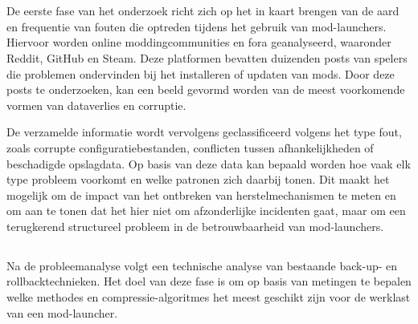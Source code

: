 
\chapter{}%
\label{ch:methodologie}

\section{}%
\label{sec:fase1-probleemanalyse}

De eerste fase van het onderzoek richt zich op het in kaart brengen van de aard en frequentie van fouten die optreden tijdens het gebruik van mod-launchers. Hiervoor worden online moddingcommunities en fora geanalyseerd, waaronder Reddit, GitHub en Steam. Deze platformen bevatten duizenden posts van spelers die problemen ondervinden bij het installeren of updaten van mods. Door deze posts te onderzoeken, kan een beeld gevormd worden van de meest voorkomende vormen van dataverlies en corruptie.

De verzamelde informatie wordt vervolgens geclassificeerd volgens het type fout, zoals corrupte configuratiebestanden, conflicten tussen afhankelijkheden of beschadigde opslagdata. Op basis van deze data kan bepaald worden hoe vaak elk type probleem voorkomt en welke patronen zich daarbij tonen. Dit maakt het mogelijk om de impact van het ontbreken van herstelmechanismen te meten en om aan te tonen dat het hier niet om afzonderlijke incidenten gaat, maar om een terugkerend structureel probleem in de betrouwbaarheid van mod-launchers.

\section{}%
\label{sec:fase2-technischeanalyse}

Na de probleemanalyse volgt een technische analyse van bestaande back-up- en rollbacktechnieken. Het doel van deze fase is om op basis van metingen te bepalen welke methodes en compressie-algoritmes het meest geschikt zijn voor de werklast van een mod-launcher.

